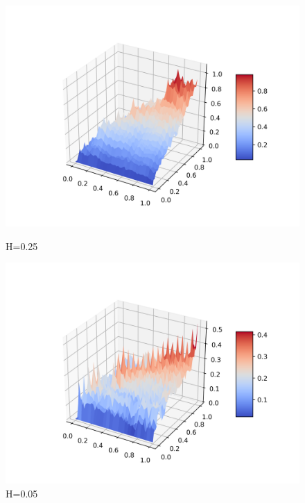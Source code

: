 \documentclass[a4paper,12pt]{article}
\numberwithin{equation}{section}
\begin{document}
	\begin{figure}[H]
		\includegraphics[scale=0.4]{covariance-1-25.png}
		\caption{H=0.25}
		\endminipage\hfill
		\includegraphics[scale=0.4]{covariance-1-05.png}
		\caption{H=0.05}
		\endminipage\hfill
	\end{figure}
	
\end{document}
